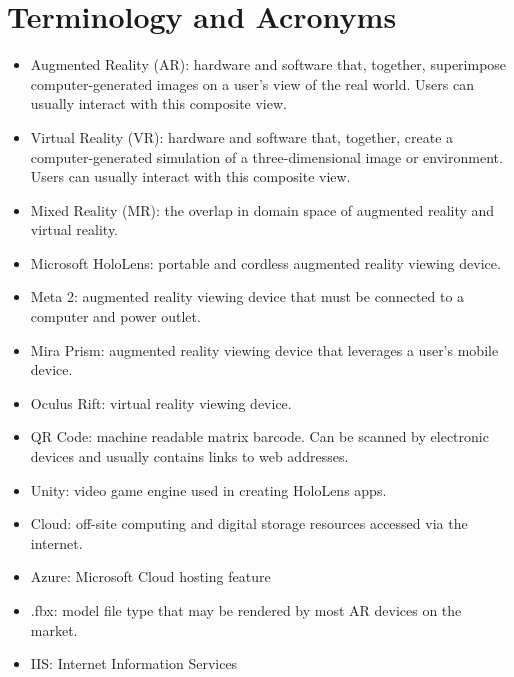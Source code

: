 \section{Terminology and Acronyms}

\begin{itemize}
	\item Augmented Reality (AR): hardware and software that, together, superimpose computer-generated images on a user's view of the real world. Users can usually interact with this composite view.

	\item Virtual Reality (VR): hardware and software that, together, create a computer-generated simulation of a three-dimensional image or environment. Users can usually interact with this composite view.

	\item Mixed Reality (MR): the overlap in domain space of augmented reality and virtual reality. 

	\item Microsoft HoloLens: portable and cordless augmented reality viewing device. 

	\item Meta 2: augmented reality viewing device that must be connected to a computer and power outlet. 

	\item Mira Prism: augmented reality viewing device that leverages a user's mobile device.

	\item Oculus Rift: virtual reality viewing device. 

    \item QR Code: machine readable matrix barcode. Can be scanned by electronic devices and usually contains links to web addresses.
    
    \item Unity: video game engine used in creating HoloLens apps.

	\item Cloud: off-site computing and digital storage resources accessed via the internet. 

    \item Azure: Microsoft Cloud hosting feature

	\item .fbx: model file type that may be rendered by most AR devices on the market. 

	\item IIS: Internet Information Services
\end{itemize}


